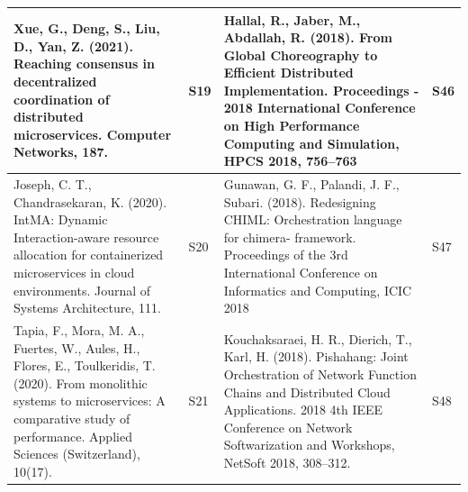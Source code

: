 \documentclass{article}
\begin{document}
\begin{appendices}
\begin{table}
\begin{center}
\begin{tabular}{ | m{20em} | m{1cm}| m{20em} | m{1cm} | }
Xue, G., Deng, S., Liu, D.,  Yan, Z. (2021). Reaching consensus in decentralized coordination of distributed microservices. Computer Networks, 187.                                                                                                                                                                                                       & S19            & Hallal, R., Jaber, M.,  Abdallah, R. (2018). From Global Choreography to Efficient Distributed Implementation. Proceedings - 2018 International Conference on High Performance Computing and Simulation, HPCS 2018, 756–763                                                                                                                                                                                                    & S46             \\ 
\hline
Joseph, C. T.,  Chandrasekaran, K. (2020). IntMA: Dynamic Interaction-aware resource allocation for containerized microservices in cloud environments. Journal of Systems Architecture, 111.                                                                                                                                                              & S20            & Gunawan, G. F., Palandi, J. F.,  Subari. (2018). Redesigning CHIML: Orchestration language for chimera- framework. Proceedings of the 3rd International Conference on Informatics and Computing, ICIC 2018                                                                                                                                                                                                                     & S47             \\ 
\hline
Tapia, F., Mora, M. A., Fuertes, W., Aules, H., Flores, E.,  Toulkeridis, T. (2020). From monolithic systems to microservices: A comparative study of performance. Applied Sciences (Switzerland), 10(17).~                                                                                                                                               & S21            & Kouchaksaraei, H. R., Dierich, T.,  Karl, H. (2018). Pishahang: Joint Orchestration of Network Function Chains and Distributed Cloud Applications. 2018 4th IEEE Conference on Network Softwarization and Workshops, NetSoft 2018, 308–312.                                                                                                                                                                                    & S48             \\ 
\hline

\end{tabular}
\end{center}
\end{table}
\end{appendices}
\end{document}
